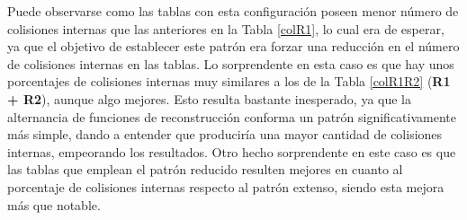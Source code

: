 \documentclass[12pt,spanish,listoffigures,listoftables,listofalgorithms]{tfgetsinf}
\begin{document}
\def\arraystretch{1.5}
\begin{table}[H]
	\centering
	\caption{Porcentajes de colisiones para las tablas empleando el patrón extenso}
	\label{colPG}
\end{table}

Puede observarse como las tablas con esta configuración poseen menor número de colisiones internas que las anteriores en la Tabla \ref{colR1}, lo cual era de esperar, ya que el objetivo de establecer este patrón era forzar una reducción en el número de colisiones internas en las tablas. Lo sorprendente en esta caso es que hay unos porcentajes de colisiones internas muy similares a los de la Tabla \ref{colR1R2} (\textbf{R1 + R2}), aunque algo mejores. Esto resulta bastante inesperado, ya que la alternancia de funciones de reconstrucción conforma un patrón significativamente más simple, dando a entender que produciría una mayor cantidad de colisiones internas, empeorando los resultados. Otro hecho sorprendente en este caso es que las tablas que emplean el patrón reducido resulten mejores en cuanto al porcentaje de colisiones internas respecto al patrón extenso, siendo esta mejora más que notable.
\end{document}
